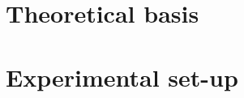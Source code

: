 
\frontmatter





\tableofcontents*
{}  %
\newpage




\mainmatter
\chapter[The fundamentals]{Theoretical basis}







\chapter[Home of the particle physicist]{Experimental set-up}

